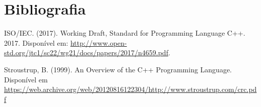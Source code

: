 \documentclass[12pt]{article}
\begin{document}
\section{Bibliografia}

ISO/IEC. (2017). Working Draft, Standard for Programming Language C++. 2017. Disponível em: \url{http://www.open-std.org/jtc1/sc22/wg21/docs/papers/2017/n4659.pdf}.

Stroustrup, B. (1999). An Overview of the C++ Programming Language. Disponível em \url{https://web.archive.org/web/20120816122304/http://www.stroustrup.com/crc.pdf}



\end{document}
